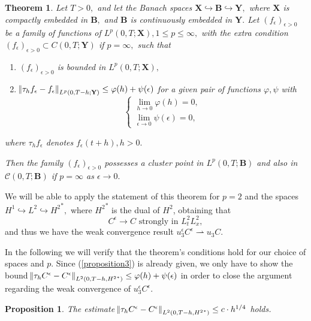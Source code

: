 \documentclass[11pt]{article}
\newtheorem{theorem}{Theorem}
\newtheorem{prop}{Proposition}
\begin{document}
\begin{theorem}
Let $T>0,$ and let the Banach spaces $\mathbf{X} \hookrightarrow \mathbf{B} \hookrightarrow \mathbf{Y},$ where $\mathbf{X}$ is compactly embedded in $\mathbf{B},$ and $\mathbf{B}$ is continuously embedded in $\mathbf{Y}.$ Let $(f_\epsilon)_{\epsilon>0}$ be a family of functions of $L^p (0,T; \mathbf{X}), 1 \leq p \leq \infty,$ with the extra condition $(f_\epsilon)_{\epsilon>0} \subset C (0,T; \mathbf{Y})$ if $p = \infty,$ such that
\begin{enumerate}
\item $(f_\epsilon)_{\epsilon>0}$ is bounded in $L^p (0,T; \mathbf{X}),$
\item $\norm{\tau_h f_\epsilon - f_\epsilon}_{L^p(0,T-h; \mathbf{Y})} \leq \varphi(h) + \psi(\epsilon)$ for a given pair of functions $\varphi, \psi$ with
$$
\begin{cases}
\lim_{h \to 0} \varphi(h) = 0,\\
\lim_{\epsilon \to 0} \psi(\epsilon) = 0,
\end{cases}
$$
\end{enumerate}

where $\tau_h f_\epsilon$ denotes $f_\epsilon (t+h), h > 0.$

Then the family $(f_\epsilon)_{\epsilon>0}$ possesses a cluster point in $L^p (0,T; \mathbf{B})$ and also in $\mathcal{C}(0,T; \mathbf{B})$ if $p = \infty$ as $\epsilon \to 0.$
\end{theorem}

We will be able to apply the statement of this theorem for $p=2$ and the spaces $H^1 \hookrightarrow L^2 \hookrightarrow {H^2}^*,$ where ${H^2}^*$ is the dual of ${H^2}$, obtaining that
%
\[C^\epsilon \to C \text{ strongly in } L^2_t L^2_x,\]
%
and thus we have the weak convergence result $u^\epsilon_3 C^\epsilon \rightharpoonup u_3 C.$

In the following we will verify that the theorem's conditions hold for our choice of spaces and $p$. Since (\ref{proposition3}) is already given, we only have to show the bound $\norm{\tau_h C^\epsilon - C^\epsilon}_{L^2(0,T-h, {H^2}^*)} \leq \varphi(h) + \psi(\epsilon)$ in order to close the argument regarding the weak convergence of $u^\epsilon_3 C^\epsilon$.

\begin{prop}
The estimate $\norm{\tau_h C^\epsilon - C^\epsilon}_{L^2(0,T-h, {H^2}^*)} \leq c \cdot h^{1/4}$ holds.
\end{prop}
\end{document}
